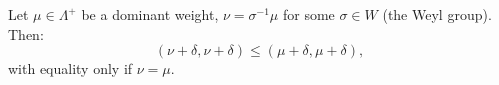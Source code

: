 Let $\mu \in \Lambda^+$ be a dominant weight, $\nu = \sigma^{-1} \mu$ for some $\sigma \in W$ (the Weyl group). Then:
$$(\nu + \delta, \nu + \delta) \leq (\mu + \delta, \mu + \delta),$$
with equality only if $\nu = \mu$.